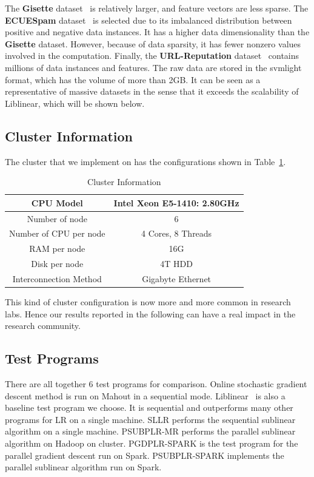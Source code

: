 \documentclass[10pt, conference, compsocconf]{IEEEtran}
\begin{document}
The \textbf{Gisette} dataset~\cite{guyon2004result} is relatively larger, and feature vectors are less sparse.
The \textbf{ECUESpam} dataset~\cite{DelanyKBS05} is selected due to its imbalanced distribution between positive and negative data instances. It has a higher data dimensionality than the \textbf{Gisette} dataset. However, because of data sparsity, it has fewer nonzero values involved in the computation.
Finally, the \textbf{URL-Reputation} dataset~\cite{ma2009identifying} contains millions of data instances and features. The raw data are stored in the svmlight format, which has the volume of more than 2GB. It can be seen as a representative of massive datasets in the sense that it exceeds the scalability of Liblinear, which will be shown below.

\subsection{Cluster Information}
The cluster that we implement on has the configurations shown in Table~\ref{tab:table2}.
\begin{table}[h]
\centering
\caption{Cluster Information}\label{tab:table2}\vspace{-0.3cm}
\begin{tabular}{|c|c|}
\hline
    CPU Model & Intel Xeon E5-1410: 2.80GHz \\
\hline
    Number of node & 6 \\
\hline
    Number of CPU per node & 4 Cores, 8 Threads \\
\hline
    RAM per node & 16G \\
\hline
    Disk per node & 4T HDD\\
\hline
    Interconnection Method & Gigabyte Ethernet  \\
\hline
\end{tabular}
\end{table}
This kind of cluster configuration is now more and more common in research labs. Hence our results reported in the following can have a real impact in the research community.

\subsection{Test Programs}
There are all together 6 test programs for comparison.
Online stochastic gradient descent method is run on Mahout in a sequential mode.
Liblinear~\cite{fan2008liblinear} is also a baseline test program we choose. It is sequential and outperforms many other programs for LR on a single machine.
SLLR performs the sequential sublinear algorithm on a single machine.
PSUBPLR-MR performs the parallel sublinear algorithm on Hadoop on cluster.
PGDPLR-SPARK is the test program for the parallel gradient descent run on Spark.
PSUBPLR-SPARK implements the parallel sublinear algorithm run on Spark.
\end{document}
